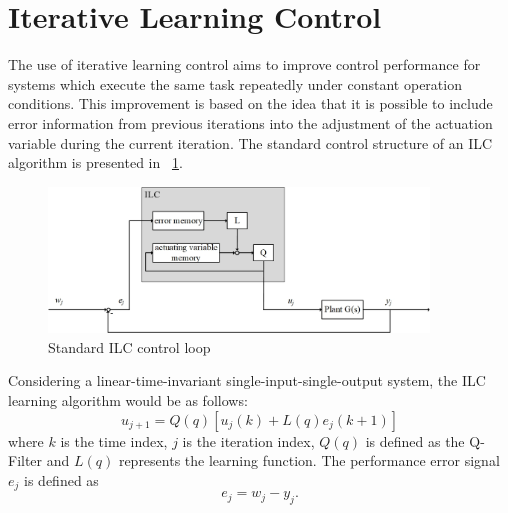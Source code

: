 \section{Iterative Learning Control}
The use of iterative learning control aims to improve control performance for systems which execute the same task repeatedly under constant operation conditions. This improvement is based on the idea that it is possible to include error information from previous iterations into the adjustment of the actuation variable during the current iteration.
The standard control structure of an ILC algorithm is presented in \figurename~\ref{fig:ILC_only}.
\begin{figure}[h]
   \centering
   \includegraphics[width=0.9\textwidth]{images/ILC_only.jpg}
   \caption[Standard ILC control loop]{Standard ILC control loop}
   \label{fig:ILC_only}
 \end{figure}
Considering a linear-time-invariant single-input-single-output system, the ILC learning algorithm would be as follows:
\begin{equation}
    u_{j+1}  = Q(q)[u_{j}(k)+L(q)e_{j}(k+1)]
 \label{eq:ILC_standard}
\end{equation}
where $k$ is the time index, $j$ is the iteration index, $Q(q)$ is defined as the Q-Filter and $L(q)$ represents the learning function. The performance error signal $e_{j}$ is defined as
\begin{equation}
    e_{j}  = w_{j}-y_{j}.
 \label{eq:perf_error}
\end{equation}

